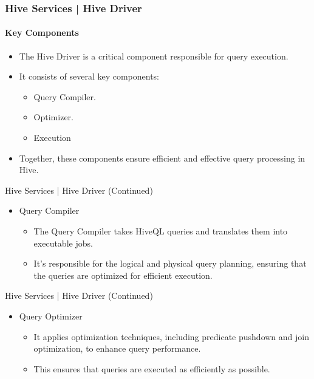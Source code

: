 \begin{frame}

\frametitle{Hive Services | Hive Driver}
	\framesubtitle{Key Components}
	
	\begin{itemize}
	  \item The Hive Driver is a critical component responsible for query execution.
	  \item It consists of several key components:
		\begin{itemize}
		  \item Query Compiler.
		  \item Optimizer.
		  \item Execution
		\end{itemize}
	  \item Together, these components ensure efficient and effective query processing in Hive.
	\end{itemize}
	
	\end{frame}
\begin{frame}{Hive Services | Hive Driver (Continued)}
	\begin{itemize}
	\item Query Compiler
		\begin{itemize}
			\item The Query Compiler takes HiveQL queries and translates them into executable jobs.
			\item It's responsible for the logical and physical query planning, ensuring that the queries are optimized for efficient execution.
		\end{itemize}
\end{itemize}
\end{frame}
\begin{frame}{Hive Services | Hive Driver (Continued)}
\begin{itemize}
\item Query Optimizer	
	\begin{itemize}
		\item It applies optimization techniques, including predicate pushdown and join optimization, to enhance query performance.
		\item This ensures that queries are executed as efficiently as possible.
	\end{itemize}
\end{itemize}
\end{frame}
